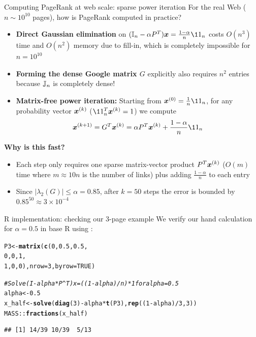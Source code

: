 \documentclass[aspectratio=169]{beamer}\usepackage[]{graphicx}\usepackage[]{xcolor}
\makeatletter
\newcommand{\hlnum}[1]{\textcolor[rgb]{0.686,0.059,0.569}{#1}}%
\newcommand{\hlcom}[1]{\textcolor[rgb]{0.678,0.584,0.686}{\textit{#1}}}%
\newcommand{\hlopt}[1]{\textcolor[rgb]{0,0,0}{#1}}%
\newcommand{\hldef}[1]{\textcolor[rgb]{0.345,0.345,0.345}{#1}}%
\newcommand{\hlkwb}[1]{\textcolor[rgb]{0.69,0.353,0.396}{#1}}%
\newcommand{\hlkwc}[1]{\textcolor[rgb]{0.333,0.667,0.333}{#1}}%
\newcommand{\hlkwd}[1]{\textcolor[rgb]{0.737,0.353,0.396}{\textbf{#1}}}%
\newenvironment{kframe}{%
 \def\at@end@of@kframe{}%
 \ifinner\ifhmode%
  \def\at@end@of@kframe{\end{minipage}}%
  \begin{minipage}{\columnwidth}%
 \fi\fi%
 \def\FrameCommand##1{\hskip\@totalleftmargin \hskip-\fboxsep
 \colorbox{shadecolor}{##1}\hskip-\fboxsep
     \hskip-\linewidth \hskip-\@totalleftmargin \hskip\columnwidth}%
 \MakeFramed {\advance\hsize-\width
   \@totalleftmargin\z@ \linewidth\hsize
   \@setminipage}}%
 {\par\unskip\endMakeFramed%
 \at@end@of@kframe}
\newenvironment{knitrout}{}{} %
\makeatother
\begin{document}
\begin{frame}{Computing PageRank at web scale: sparse power iteration}
For the real Web ($n \sim 10^{10}$ pages), how is PageRank computed in practice?
\vfill
\begin{itemize}
\item \textbf{Direct Gaussian elimination} on $(\II_n - \alpha P^T)\bx = \frac{1-\alpha}{n}\11_n$ costs $O(n^3)$ time and $O(n^2)$ memory due to fill-in, which is completely impossible for $n = 10^{10}$
\item \textbf{Forming the dense Google matrix $G$} explicitly also requires $n^2$ entries because $\mathbb{J}_n$ is completely dense!
\item \textbf{Matrix-free power iteration:} Starting from $\bx^{(0)} = \frac{1}{n}\11_n$, for any probability vector $\bm{x}^{(k)}$ ($\11_n^T \bx^{(k)} = 1$) we compute
\[
\bx^{(k+1)} = G^T \bx^{(k)} = \alpha P^T \bx^{(k)} + \frac{1 - \alpha}{n}\11_n
\]
\end{itemize}
\vfill
\textbf{Why is this fast?}
\begin{itemize}
\item Each step only requires one sparse matrix-vector product $P^T \bm{x}^{(k)}$ ($O(m)$ time where $m \approx 10n$ is the number of links) plus adding $\frac{1-\alpha}{n}$ to each entry
\item Since $|\lambda_2(G)| \le \alpha = 0.85$, after $k = 50$ steps the error is bounded by $0.85^{50} \approx 3 \times 10^{-4}$
\end{itemize}
\end{frame}

\begin{frame}[fragile]{R implementation: checking our 3-page example}
We verify our hand calculation for $\alpha = 0.5$ in base R using :
\begin{knitrout}
\color{fgcolor}\begin{kframe}
\begin{alltt}
\hldef{P3} \hlkwb{<-} \hlkwd{matrix}\hldef{(}\hlkwd{c}\hldef{(}\hlnum{0}\hldef{,} \hlnum{0.5}\hldef{,} \hlnum{0.5}\hldef{,}
               \hlnum{0}\hldef{,} \hlnum{0}\hldef{,}   \hlnum{1}\hldef{,}
               \hlnum{1}\hldef{,} \hlnum{0}\hldef{,}   \hlnum{0}\hldef{),} \hlkwc{nrow} \hldef{=} \hlnum{3}\hldef{,} \hlkwc{byrow} \hldef{=} \hlnum{TRUE}\hldef{)}

\hlcom{# Solve (I - alpha * P^T) x = ((1 - alpha) / n) * 1 for alpha = 0.5}
\hldef{alpha} \hlkwb{<-} \hlnum{0.5}
\hldef{x_half} \hlkwb{<-} \hlkwd{solve}\hldef{(}\hlkwd{diag}\hldef{(}\hlnum{3}\hldef{)} \hlopt{-} \hldef{alpha} \hlopt{*} \hlkwd{t}\hldef{(P3),} \hlkwd{rep}\hldef{((}\hlnum{1} \hlopt{-} \hldef{alpha)} \hlopt{/} \hlnum{3}\hldef{,} \hlnum{3}\hldef{))}
\hldef{MASS}\hlopt{::}\hlkwd{fractions}\hldef{(x_half)}
\end{alltt}
\begin{verbatim}
## [1] 14/39 10/39  5/13
\end{verbatim}
\end{kframe}
\end{knitrout}
\end{frame}
\end{document}

